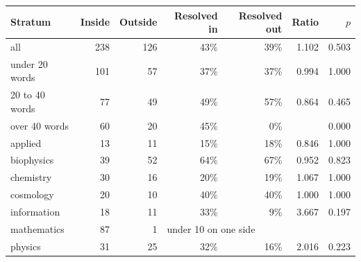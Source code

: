 \begin{tabular}{@{}lrrrrrr@{}}
\toprule
Stratum & Inside & Outside & Resolved in & Resolved out & Ratio & $p$ \\
\midrule
all & 238 & 126 & 43\% & 39\% & 1.102 & 0.503 \\
under 20 words & 101 & 57 & 37\% & 37\% & 0.994 & 1.000 \\
20 to 40 words & 77 & 49 & 49\% & 57\% & 0.864 & 0.465 \\
over 40 words & 60 & 20 & 45\% & 0\% &  & 0.000 \\
applied & 13 & 11 & 15\% & 18\% & 0.846 & 1.000 \\
biophysics & 39 & 52 & 64\% & 67\% & 0.952 & 0.823 \\
chemistry & 30 & 16 & 20\% & 19\% & 1.067 & 1.000 \\
cosmology & 20 & 10 & 40\% & 40\% & 1.000 & 1.000 \\
information & 18 & 11 & 33\% & 9\% & 3.667 & 0.197 \\
mathematics & 87 & 1 & \multicolumn{4}{l}{under 10 on one side} \\
physics & 31 & 25 & 32\% & 16\% & 2.016 & 0.223 \\
\bottomrule
\end{tabular}
